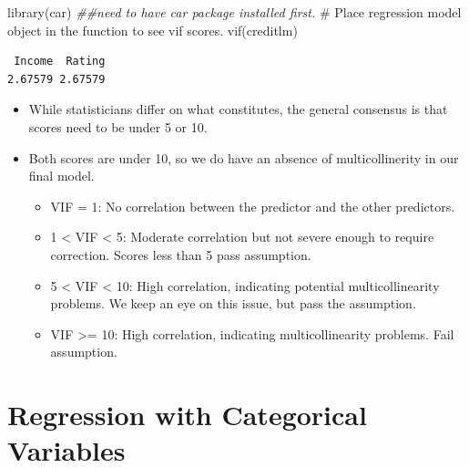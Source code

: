 \documentclass[
  letterpaper,
  DIV=11,
  numbers=noendperiod]{scrreprt}
\newenvironment{Shaded}{\begin{snugshade}}{\end{snugshade}}
\newcommand{\CommentTok}[1]{\textcolor[rgb]{0.37,0.37,0.37}{#1}}
\newcommand{\DocumentationTok}[1]{\textcolor[rgb]{0.37,0.37,0.37}{\textit{#1}}}
\newcommand{\FunctionTok}[1]{\textcolor[rgb]{0.28,0.35,0.67}{#1}}
\newcommand{\NormalTok}[1]{\textcolor[rgb]{0.00,0.23,0.31}{#1}}
\providecommand{\tightlist}{%
  \setlength{\itemsep}{0pt}\setlength{\parskip}{0pt}}\usepackage{longtable,booktabs,array}
\begin{document}
\begin{Shaded}
\begin{Highlighting}[]
\FunctionTok{library}\NormalTok{(car)  }\DocumentationTok{\#\#need to have car package installed first. }
\CommentTok{\# Place regression model object in the function to see vif scores.}
\FunctionTok{vif}\NormalTok{(creditlm)}
\end{Highlighting}
\end{Shaded}

\begin{verbatim}
 Income  Rating 
2.67579 2.67579 
\end{verbatim}

\begin{itemize}
\tightlist
\item
  While statisticians differ on what constitutes, the general consensus
  is that scores need to be under 5 or 10.
\item
  Both scores are under 10, so we do have an absence of multicollinerity
  in our final model.

  \begin{itemize}
  \tightlist
  \item
    VIF = 1: No correlation between the predictor and the other
    predictors.
  \item
    1 \textless{} VIF \textless{} 5: Moderate correlation but not severe
    enough to require correction. Scores less than 5 pass assumption.
  \item
    5 \textless{} VIF \textless{} 10: High correlation, indicating
    potential multicollinearity problems. We keep an eye on this issue,
    but pass the assumption.
  \item
    VIF \textgreater= 10: High correlation, indicating multicollinearity
    problems. Fail assumption.
  \end{itemize}
\end{itemize}


\chapter{Regression with Categorical
Variables}\label{regression-with-categorical-variables}
\end{document}
